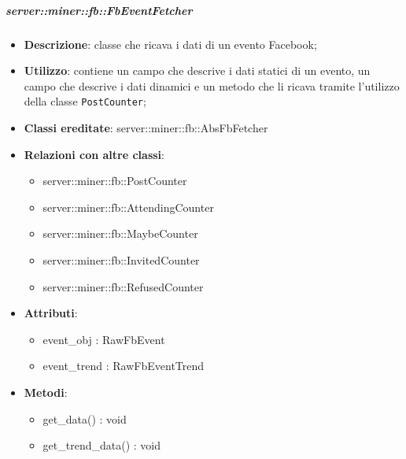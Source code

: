 		\subparagraph{server::miner::fb::FbEventFetcher} %
		\label{subp:server_miner_fb_FbEventFetcher}
			\begin{itemize}
				\item \textbf{Descrizione}: classe che ricava i dati di un evento Facebook;
				\item \textbf{Utilizzo}: contiene un campo che descrive i dati statici di un evento, un campo che descrive i dati dinamici e un metodo che li ricava tramite l'utilizzo della classe \texttt{PostCounter};
				\item \textbf{Classi ereditate}: server::miner::fb::AbsFbFetcher
				\item \textbf{Relazioni con altre classi}:
					\begin{itemize}
						\item server::miner::fb::PostCounter
						\item server::miner::fb::AttendingCounter
						\item server::miner::fb::MaybeCounter
						\item server::miner::fb::InvitedCounter
						\item server::miner::fb::RefusedCounter
					\end{itemize}
				\item \textbf{Attributi}: 
					\begin{itemize}
						\item event\_obj : RawFbEvent
						\item event\_trend : RawFbEventTrend
					\end{itemize}
				\item \textbf{Metodi}:   
					\begin{itemize}
						\item get\_data() : void
						\item get\_trend\_data() : void
					\end{itemize}
			\end{itemize}

